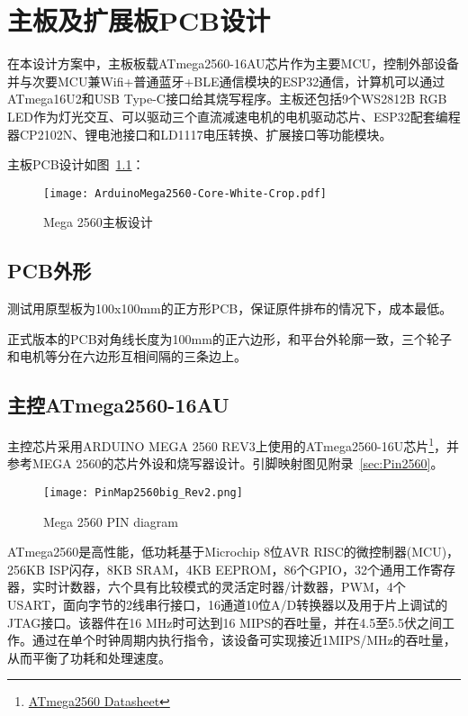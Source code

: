 \chapter{主板及扩展板PCB设计}
\label{cha:PCB}

在本设计方案中，主板板载ATmega2560-16AU芯片作为主要MCU，控制外部设备并与次要MCU兼Wifi+普通蓝牙+BLE通信模块的ESP32通信，计算机可以通过ATmega16U2和USB Type-C接口给其烧写程序。主板还包括9个WS2812B RGB LED作为灯光交互、可以驱动三个直流减速电机的电机驱动芯片、ESP32配套编程器CP2102N、锂电池接口和LD1117电压转换、扩展接口等功能模块。


主板PCB设计如图~\ref{fig:CorePCB}：

\begin{figure}[htbp]
    \centering
    \texttt{[image: ArduinoMega2560-Core-White-Crop.pdf]}
    \caption{Mega 2560主板设计}
    \label{fig:CorePCB}
\end{figure}

\section{PCB外形}

测试用原型板为100x100mm的正方形PCB，保证原件排布的情况下，成本最低。

正式版本的PCB对角线长度为100mm的正六边形，和平台外轮廓一致，三个轮子和电机等分在六边形互相间隔的三条边上。

\section{主控ATmega2560-16AU}

主控芯片采用ARDUINO MEGA 2560 REV3\cite{arduino_mega-2560-r3}上使用的ATmega2560-16U芯片\footnote{\href{http://www.atmel.com/Images/Atmel-2549-8-bit-AVR-Microcontroller-ATmega640-1280-1281-2560-2561_datasheet.pdf}{ATmega2560 Datasheet}}，并参考MEGA 2560的芯片外设和烧写器设计。引脚映射图见附录~\ref{sec:Pin2560}。

\begin{figure}[htbp]
    \centering
    \texttt{[image: PinMap2560big\_Rev2.png]}
    \caption{Mega 2560 PIN diagram}
    \label{fig:PinMap2560}
\end{figure}

ATmega2560是高性能，低功耗基于Microchip 8位AVR RISC的微控制器(MCU)，256KB ISP闪存，8KB SRAM，4KB EEPROM，86个GPIO，32个通用工作寄存器，实时计数器，六个具有比较模式的灵活定时器/计数器，PWM，4个USART，面向字节的2线串行接口，16通道10位A/D转换器以及用于片上调试的JTAG接口。该器件在16 MHz时可达到16 MIPS的吞吐量，并在4.5至5.5伏之间工作。通过在单个时钟周期内执行指令，该设备可实现接近1MIPS/MHz的吞吐量，从而平衡了功耗和处理速度。

